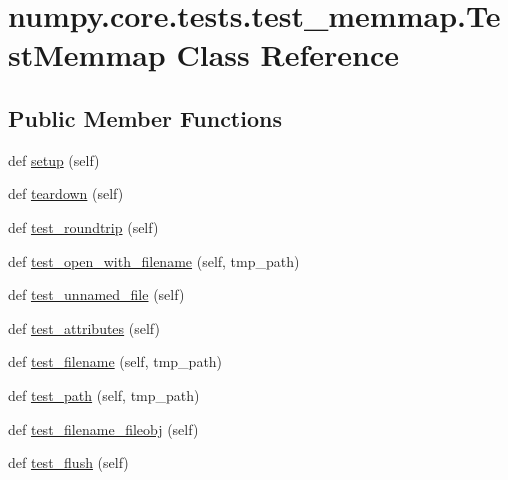 \hypertarget{classnumpy_1_1core_1_1tests_1_1test__memmap_1_1TestMemmap}{}\section{numpy.\+core.\+tests.\+test\+\_\+memmap.\+Test\+Memmap Class Reference}
\label{classnumpy_1_1core_1_1tests_1_1test__memmap_1_1TestMemmap}
\subsection*{Public Member Functions}
\begin{DoxyCompactItemize}
\item 
def \hyperlink{classnumpy_1_1core_1_1tests_1_1test__memmap_1_1TestMemmap_acc3af9b00efc08578ef502a6c0336269}{setup} (self)
\item 
def \hyperlink{classnumpy_1_1core_1_1tests_1_1test__memmap_1_1TestMemmap_a7878a9d6574cf9a9995b9357d4f3be89}{teardown} (self)
\item 
def \hyperlink{classnumpy_1_1core_1_1tests_1_1test__memmap_1_1TestMemmap_a2bdc3c50e69a58661662b93884dd6e51}{test\+\_\+roundtrip} (self)
\item 
def \hyperlink{classnumpy_1_1core_1_1tests_1_1test__memmap_1_1TestMemmap_aae7531ebd897c852b96bab0b523c3191}{test\+\_\+open\+\_\+with\+\_\+filename} (self, tmp\+\_\+path)
\item 
def \hyperlink{classnumpy_1_1core_1_1tests_1_1test__memmap_1_1TestMemmap_a59e35cbff81671f7e0f35c40cddd0182}{test\+\_\+unnamed\+\_\+file} (self)
\item 
def \hyperlink{classnumpy_1_1core_1_1tests_1_1test__memmap_1_1TestMemmap_affa47dffac99ee0033af0ce1af9c25bf}{test\+\_\+attributes} (self)
\item 
def \hyperlink{classnumpy_1_1core_1_1tests_1_1test__memmap_1_1TestMemmap_a8247fb71b87dcafd6712b23774ead027}{test\+\_\+filename} (self, tmp\+\_\+path)
\item 
def \hyperlink{classnumpy_1_1core_1_1tests_1_1test__memmap_1_1TestMemmap_a324e22d032d4de2097f7d0e278fe8be7}{test\+\_\+path} (self, tmp\+\_\+path)
\item 
def \hyperlink{classnumpy_1_1core_1_1tests_1_1test__memmap_1_1TestMemmap_a0a8a4344b3d15056bf6cc5012f9b10bb}{test\+\_\+filename\+\_\+fileobj} (self)
\item 
def \hyperlink{classnumpy_1_1core_1_1tests_1_1test__memmap_1_1TestMemmap_a0972a80aa834c561306abd145f7c1fc9}{test\+\_\+flush} (self)

\end{DoxyCompactItemize}
